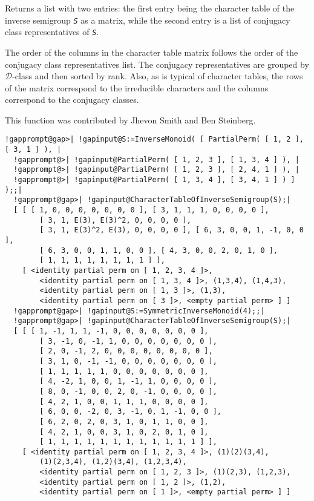\documentclass[a4paper,11pt]{report}
\begin{document}
{{{ Returns a list with two entries: the first entry being the character table of
the inverse semigroup \mbox{\texttt{\mdseries\slshape S}} as a matrix, while the second entry is a list of conjugacy class
representatives of \mbox{\texttt{\mdseries\slshape S}}. 

 The order of the columns in the character table matrix follows the order of
the conjugacy class representatives list. The conjugacy representatives are
grouped by $\mathcal{D}$-class and then sorted by rank. Also, as is typical of character tables, the
rows of the matrix correspond to the irreducible characters and the columns
correspond to the conjugacy classes. 

 This function was contributed by Jhevon Smith and Ben Steinberg. 
\begin{Verbatim}[commandchars=!@|,fontsize=\small,frame=single,label=Example]
  !gapprompt@gap>| !gapinput@S:=InverseMonoid( [ PartialPerm( [ 1, 2 ], [ 3, 1 ] ), |
  !gapprompt@>| !gapinput@PartialPerm( [ 1, 2, 3 ], [ 1, 3, 4 ] ), |
  !gapprompt@>| !gapinput@PartialPerm( [ 1, 2, 3 ], [ 2, 4, 1 ] ), |
  !gapprompt@>| !gapinput@PartialPerm( [ 1, 3, 4 ], [ 3, 4, 1 ] ) ] );;|
  !gapprompt@gap>| !gapinput@CharacterTableOfInverseSemigroup(S);|
  [ [ [ 1, 0, 0, 0, 0, 0, 0, 0 ], [ 3, 1, 1, 1, 0, 0, 0, 0 ], 
        [ 3, 1, E(3), E(3)^2, 0, 0, 0, 0 ], 
        [ 3, 1, E(3)^2, E(3), 0, 0, 0, 0 ], [ 6, 3, 0, 0, 1, -1, 0, 0 ],
        [ 6, 3, 0, 0, 1, 1, 0, 0 ], [ 4, 3, 0, 0, 2, 0, 1, 0 ], 
        [ 1, 1, 1, 1, 1, 1, 1, 1 ] ], 
    [ <identity partial perm on [ 1, 2, 3, 4 ]>, 
        <identity partial perm on [ 1, 3, 4 ]>, (1,3,4), (1,4,3), 
        <identity partial perm on [ 1, 3 ]>, (1,3), 
        <identity partial perm on [ 3 ]>, <empty partial perm> ] ]
  !gapprompt@gap>| !gapinput@S:=SymmetricInverseMonoid(4);;|
  !gapprompt@gap>| !gapinput@CharacterTableOfInverseSemigroup(S);|
  [ [ [ 1, -1, 1, 1, -1, 0, 0, 0, 0, 0, 0, 0 ], 
        [ 3, -1, 0, -1, 1, 0, 0, 0, 0, 0, 0, 0 ], 
        [ 2, 0, -1, 2, 0, 0, 0, 0, 0, 0, 0, 0 ], 
        [ 3, 1, 0, -1, -1, 0, 0, 0, 0, 0, 0, 0 ], 
        [ 1, 1, 1, 1, 1, 0, 0, 0, 0, 0, 0, 0 ], 
        [ 4, -2, 1, 0, 0, 1, -1, 1, 0, 0, 0, 0 ], 
        [ 8, 0, -1, 0, 0, 2, 0, -1, 0, 0, 0, 0 ], 
        [ 4, 2, 1, 0, 0, 1, 1, 1, 0, 0, 0, 0 ], 
        [ 6, 0, 0, -2, 0, 3, -1, 0, 1, -1, 0, 0 ], 
        [ 6, 2, 0, 2, 0, 3, 1, 0, 1, 1, 0, 0 ], 
        [ 4, 2, 1, 0, 0, 3, 1, 0, 2, 0, 1, 0 ], 
        [ 1, 1, 1, 1, 1, 1, 1, 1, 1, 1, 1, 1 ] ], 
    [ <identity partial perm on [ 1, 2, 3, 4 ]>, (1)(2)(3,4), 
        (1)(2,3,4), (1,2)(3,4), (1,2,3,4), 
        <identity partial perm on [ 1, 2, 3 ]>, (1)(2,3), (1,2,3), 
        <identity partial perm on [ 1, 2 ]>, (1,2), 
        <identity partial perm on [ 1 ]>, <empty partial perm> ] ]
\end{Verbatim}
 }

}}
\end{document}
